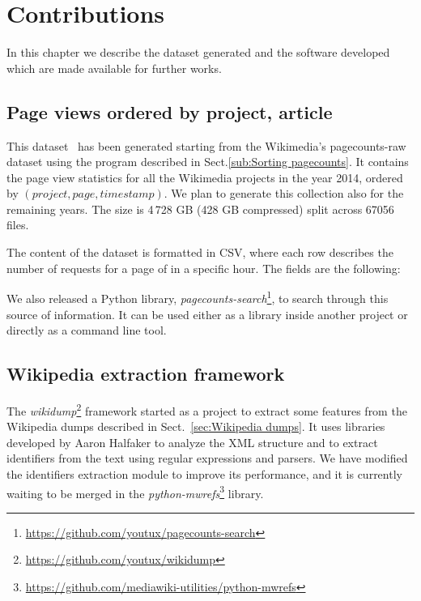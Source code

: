 \cleardoublepage{}
\chapter{Contributions}
\label{cha:Contributions}
In this chapter we describe the dataset generated and the software developed which are made available for further works.

\section{Page views ordered by project, article}
\label{sec:contrib_datasets_pagecounts}
This dataset~\cite{Bogon2016} has been generated starting from the Wikimedia's pagecounts-raw dataset using the program described in Sect.\ref{sub:Sorting pagecounts}.
It contains the page view statistics for all the Wikimedia projects in the year 2014, ordered by $(project, page, timestamp)$.
We plan to generate this collection also for the remaining years.
The size is 4\,728 GB (428 GB compressed) split across 67056 files.

The content of the dataset is formatted in CSV, where each row describes the number of requests for a page of in a specific hour.
The fields are the following:

We also released a Python library, \emph{pagecounts-search}\footnote{\url{https://github.com/youtux/pagecounts-search}}, to search through this source of information.
It can be used either as a library inside another project or directly as a command line tool.

\section{Wikipedia extraction framework}
\label{sub:contrib_programs_framework}
The \emph{wikidump}\footnote{\url{https://github.com/youtux/wikidump}} framework started as a project to extract some features from the Wikipedia dumps described in Sect.~\ref{sec:Wikipedia dumps}.
It uses libraries developed by Aaron Halfaker to analyze the XML structure and to extract identifiers from the text using regular expressions and parsers.
We have modified the identifiers extraction module to improve its performance, and it is currently waiting to be merged in the \emph{python-mwrefs}\footnote{\url{https://github.com/mediawiki-utilities/python-mwrefs}} library.

